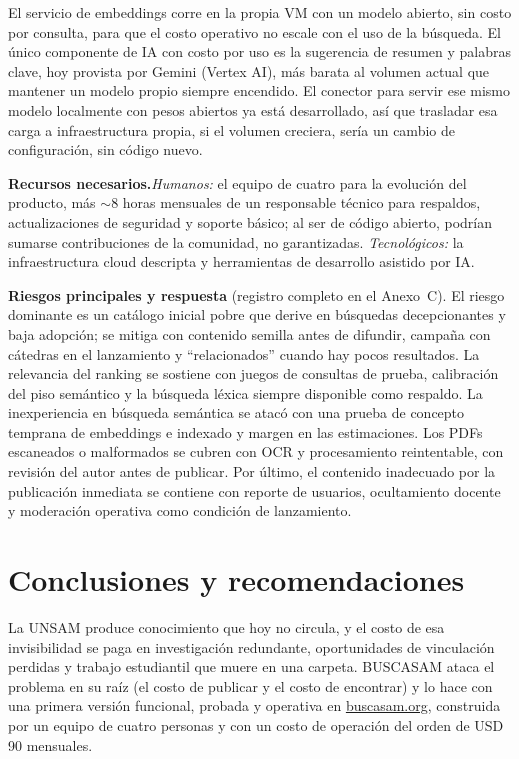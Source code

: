 \documentclass[12pt,a4paper]{article}
\begin{document}
\medskip
El servicio de embeddings corre en la propia VM con un modelo abierto, sin costo por consulta, para que el costo operativo no escale con el uso de la búsqueda. El único componente de IA con costo por uso es la sugerencia de resumen y palabras clave, hoy provista por Gemini (Vertex AI), más barata al volumen actual que mantener un modelo propio siempre encendido. El conector para servir ese mismo modelo localmente con pesos abiertos ya está desarrollado, así que trasladar esa carga a infraestructura propia, si el volumen creciera, sería un cambio de configuración, sin código nuevo.

\medskip
\noindent\textbf{Recursos necesarios.}\enspace \emph{Humanos:} el equipo de cuatro para la evolución del producto, más $\sim$8 horas mensuales de un responsable técnico para respaldos, actualizaciones de seguridad y soporte básico; al ser de código abierto, podrían sumarse contribuciones de la comunidad, no garantizadas. \emph{Tecnológicos:} la infraestructura cloud descripta y herramientas de desarrollo asistido por IA.

\medskip
\noindent\textbf{Riesgos principales y respuesta} (registro completo en el Anexo~C). El riesgo dominante es un catálogo inicial pobre que derive en búsquedas decepcionantes y baja adopción; se mitiga con contenido semilla antes de difundir, campaña con cátedras en el lanzamiento y “relacionados” cuando hay pocos resultados. La relevancia del ranking se sostiene con juegos de consultas de prueba, calibración del piso semántico y la búsqueda léxica siempre disponible como respaldo. La inexperiencia en búsqueda semántica se atacó con una prueba de concepto temprana de embeddings e indexado y margen en las estimaciones. Los PDFs escaneados o malformados se cubren con OCR y procesamiento reintentable, con revisión del autor antes de publicar. Por último, el contenido inadecuado por la publicación inmediata se contiene con reporte de usuarios, ocultamiento docente y moderación operativa como condición de lanzamiento.

\section{Conclusiones y recomendaciones}

La UNSAM produce conocimiento que hoy no circula, y el costo de esa invisibilidad se paga en investigación redundante, oportunidades de vinculación perdidas y trabajo estudiantil que muere en una carpeta. BUSCASAM ataca el problema en su raíz (el costo de publicar y el costo de encontrar) y lo hace con una primera versión funcional, probada y operativa en \href{https://buscasam.org}{buscasam.org}, construida por un equipo de cuatro personas y con un costo de operación del orden de USD 90 mensuales.
\end{document}
